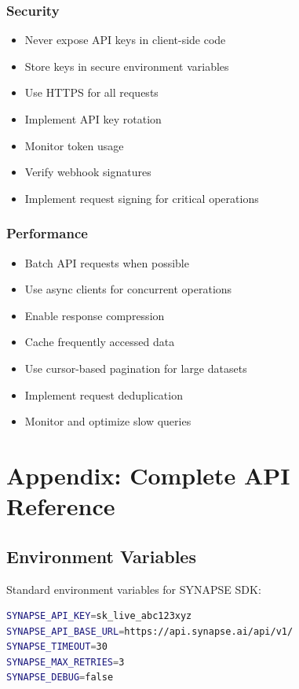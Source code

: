 \documentclass{report}
\begin{document}
\subsection{Security}

\begin{itemize}
    \item Never expose API keys in client-side code
    \item Store keys in secure environment variables
    \item Use HTTPS for all requests
    \item Implement API key rotation
    \item Monitor token usage
    \item Verify webhook signatures
    \item Implement request signing for critical operations
\end{itemize}

\subsection{Performance}

\begin{itemize}
    \item Batch API requests when possible
    \item Use async clients for concurrent operations
    \item Enable response compression
    \item Cache frequently accessed data
    \item Use cursor-based pagination for large datasets
    \item Implement request deduplication
    \item Monitor and optimize slow queries
\end{itemize}

\chapter{Appendix: Complete API Reference}

\section{Environment Variables}

Standard environment variables for SYNAPSE SDK:

\begin{lstlisting}[language=bash]
SYNAPSE_API_KEY=sk_live_abc123xyz
SYNAPSE_API_BASE_URL=https://api.synapse.ai/api/v1/
SYNAPSE_TIMEOUT=30
SYNAPSE_MAX_RETRIES=3
SYNAPSE_DEBUG=false
\end{lstlisting}
\end{document}
